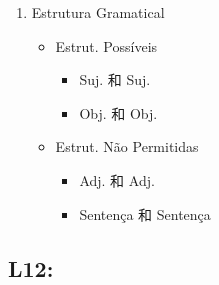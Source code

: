 \documentclass[11pt]{article}
\begin{document}
\begin{enumerate}
\item Estrutura Gramatical
\label{sec:org9783e25}
\begin{itemize}
\item Estrut. Possíveis
\begin{itemize}
\item Suj. 和 Suj.
\item Obj. 和 Obj.
\end{itemize}

\item Estrut. Não Permitidas
\begin{itemize}
\item Adj. 和 Adj.
\item Sentença 和 Sentença
\end{itemize}
\end{itemize}
\end{enumerate}


\subsection{L12:}
\label{sec:orged8ea6c}
\end{document}
